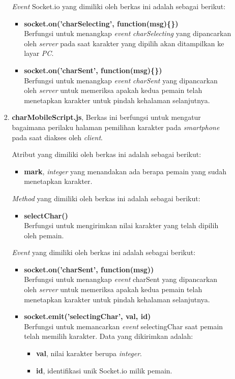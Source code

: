 \begin{enumerate}
\begin{enumerate}
\begin{enumerate}
			\textit{Event} Socket.io yang dimiliki oleh berkas ini adalah sebagai berikut:
			\begin{itemize}
				\item \textbf{socket.on('charSelecting', function(msg)\{\})} \\
				Berfungsi untuk menangkap \textit{event} \textit{charSelecting} yang dipancarkan oleh \textit{server} pada saat karakter yang dipilih akan ditampilkan ke layar \textit{PC}.
				
				\item \textbf{socket.on('charSent', function(msg)\{\})} \\
				Berfungsi untuk menangkap \textit{event} \textit{charSent} yang dipancarkan oleh \textit{server} untuk memeriksa apakah kedua pemain telah menetapkan karakter untuk pindah kehalaman selanjutnya.
			\end{itemize}
			
			\item \textbf{charMobileScript.js}, Berkas ini berfungsi untuk mengatur bagaimana perilaku halaman pemilihan karakter pada \textit{smartphone} pada saat diakses oleh \textit{client}.
			
			Atribut yang dimiliki oleh berkas ini adalah sebagai berikut:
			\begin{itemize}
				\item \textbf{mark}, \textit{integer} yang menandakan ada berapa pemain yang sudah menetapkan karakter.
			\end{itemize}
		
			\textit{Method} yang dimiliki oleh berkas ini adalah sebagai berikut:
			\begin{itemize}
				\item \textbf{selectChar()} \\
				Berfungsi untuk mengirimkan nilai karakter yang telah dipilih oleh pemain.
			\end{itemize}
			
			\textit{Event} yang dimiliki oleh berkas ini adalah sebagai berikut:
			\begin{itemize}
				\item \textbf{socket.on('charSent', function(msg){})} \\ 
				Berfungsi untuk menangkap \textit{event} charSent yang dipancarkan oleh \textit{server} untuk memeriksa apakah kedua pemain telah menetapkan karakter untuk pindah kehalaman selanjutnya.
				
				\item \textbf{socket.emit('selectingChar', {val, id})} \\
				Berfungsi untuk memancarkan \textit{event} selectingChar saat pemain telah memilih karakter. Data yang dikirimkan adalah:
				\begin{itemize}
					\item \textbf{val}, nilai karakter berupa \textit{integer}.
					\item \textbf{id}, identifikasi unik Socket.io milik pemain.
				\end{itemize}
			

\end{itemize}
\end{enumerate}
\end{enumerate}
\end{enumerate}

